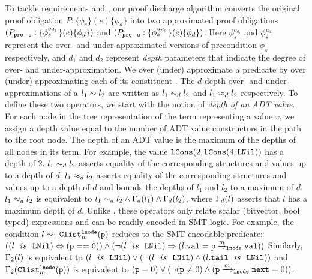 To tackle requirements  and ,
our proof discharge algorithm converts the original proof obligation $P: \{\phi_s\} (e) \{\phi_d\}$
into two approximated proof obligations $(P_{{\tt pre-o}}: \{\phi^{o_{d_1}}_s\} (e) \{\phi_d\})$
and $(P_{{\tt pre-u}}: \{\phi^{u_{d_2}}_s\} (e) \{\phi_d\})$.
Here $\phi^{o_{d_1}}_s$ and
$\phi^{u_{d_2}}_s$ represent the over- and under-approximated
versions of precondition $\phi_s$ respectively, and $d_1$ and $d_2$ represent
{\em depth} parameters that indicate the degree of over- and
under-approximation. We over (under) approximate a predicate by over (under)
approximating each of its constituent \recursiveRelation{}.
The $d$-depth over- and under-approximations of a \recursiveRelation{} $l_1\sim{}l_2$
are written as $l_1\sim_dl_2$ and $l_1\approx_dl_2$ respectively.
To define these two operators, we start with the notion of {\em depth of an ADT value}.
For each node in the tree representation of the term representing a value $v$,
we assign a depth value equal to the number of ADT value constructors in the path
to the root node. The depth of an ADT value is the maximum of the depths of all nodes in
its term. For example, the value ${\tt LCons}(2, {\tt LCons}(4, {\tt LNil}))$ has a depth
of 2. $l_1\sim_dl_2$ asserts equality of the corresponding structures and values
up to a depth of $d$. $l_1\approx_dl_2$ asserts equality of the corresponding structures
and values up to a depth of $d$ and bounds the depths of $l_1$ and $l_2$ to a maximum of $d$.
$l_1\approx_dl_2$ is equivalent to $l_1\sim_dl_2 \land \Gamma_d(l_1) \land \Gamma_d(l_2)$,
where $\Gamma_d(l)$ asserts that $l$ has a maximum depth of $d$.
Unlike \recursiveRelations{}, these operators only relate
scalar (bitvector, bool typed) expressions and can be readily encoded in SMT logic.
For example, the condition $l\sim_1{\tt Clist}^{{\tt lnode}}_{m}({\tt p})$
reduces to the SMT-encodable predicate:
$
((l\ \ is\ \ {\tt LNil}) \Leftrightarrow {\tt (p == 0)}) \land (\neg(l\ \ is\ \ {\tt LNil})\Rightarrow(l{\tt.val}={\tt p} \overset{m}{\rightarrow}_{{\tt lnode}} {\tt val}))
$
Similarly, $\Gamma_2(l)$ is equivalent to
$(l\ \ is\ \ {\tt LNil}) \vee (\neg(l\ \ is\ \ {\tt LNil})\land(l{\tt .tail}\ \ is\ \ {\tt LNil}))$
and $\Gamma_2({\tt Clist}^{{\tt lnode}}_{m}({\tt p}))$
is equivalent to
$({\tt p}=0) \vee (\neg({\tt p}\neq 0)\land({\tt p}\xrightarrow[]{m}_{{\tt lnode}}\mathrm{\tt next}=0))$.

